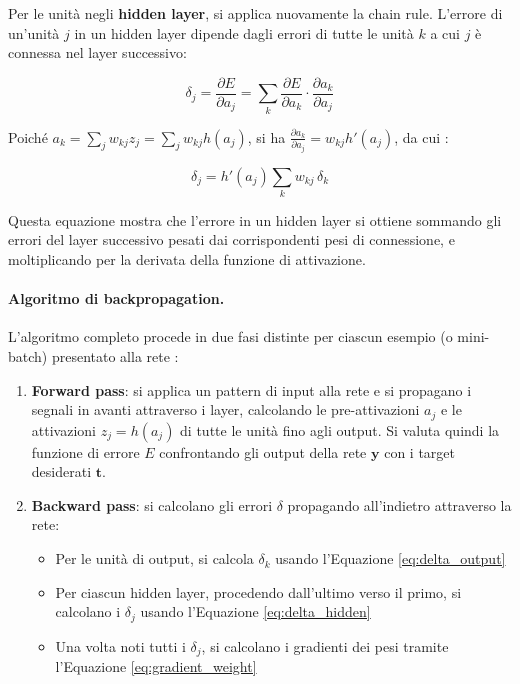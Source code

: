 Per le unità negli \textbf{hidden layer}, si applica nuovamente la chain rule. L'errore di un'unità $j$ in un hidden layer dipende dagli errori di tutte le unità $k$ a cui $j$ è connessa nel layer successivo:

\begin{equation}
\delta_j = \frac{\partial E}{\partial a_j} = \sum_k \frac{\partial E}{\partial a_k} \cdot \frac{\partial a_k}{\partial a_j}
\end{equation}

Poiché $a_k = \sum_j w_{kj} z_j = \sum_j w_{kj} h(a_j)$, si ha $\frac{\partial a_k}{\partial a_j} = w_{kj} h'(a_j)$, da cui \cite{bishop2006pattern}:

\begin{equation}
\delta_j = h'(a_j) \sum_k w_{kj} \, \delta_k
\label{eq:delta_hidden}
\end{equation}

Questa equazione mostra che l'errore in un hidden layer si ottiene sommando gli errori del layer successivo pesati dai corrispondenti pesi di connessione, e moltiplicando per la derivata della funzione di attivazione.

\paragraph{Algoritmo di backpropagation.} L'algoritmo completo procede in due fasi distinte per ciascun esempio (o mini-batch) presentato alla rete \cite{bishop2006pattern, rumelhart1986learning}:

\begin{enumerate}
\item \textbf{Forward pass}: si applica un pattern di input alla rete e si propagano i segnali in avanti attraverso i layer, calcolando le pre-attivazioni $a_j$ e le attivazioni $z_j = h(a_j)$ di tutte le unità fino agli output. Si valuta quindi la funzione di errore $E$ confrontando gli output della rete $\mathbf{y}$ con i target desiderati $\mathbf{t}$.

\item \textbf{Backward pass}: si calcolano gli errori $\delta$ propagando all'indietro attraverso la rete:
    \begin{itemize}
    \item Per le unità di output, si calcola $\delta_k$ usando l'Equazione \ref{eq:delta_output}
    \item Per ciascun hidden layer, procedendo dall'ultimo verso il primo, si calcolano i $\delta_j$ usando l'Equazione \ref{eq:delta_hidden}
    \item Una volta noti tutti i $\delta_j$, si calcolano i gradienti dei pesi tramite l'Equazione \ref{eq:gradient_weight}
    \end{itemize}
\end{enumerate}

